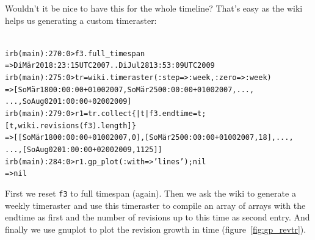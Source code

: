 \documentclass[a4paper]{scrartcl}
\newcounter{tcounter}
\newcommand{\tcount}{\makebox[0pt][r]{\tiny\thetcounter~}}
\newenvironment{typed}{\refstepcounter{tcounter}\bgroup\setlength{\topsep}{0pt}\renewcommand{\FrameCommand}[1]{\fcolorbox{black!30}{bgcolor}{##1}\tcount}\MakeFramed{\FrameRestore}\begin{alltt}\small}{\end{alltt}\endMakeFramed\egroup\par\aftergroup\noindent\aftergroup\ignorespaces}
\newcommand{\cmd}[1]{\texttt{\color{cmd}#1}}
\newcommand{\p}{\textcolor{prompt}}
\renewcommand{\c}{\textcolor{cmd}}
\begin{document}
Wouldn't it be nice to have this for the whole timeline? That's easy
as the wiki helps us generating a custom timeraster:
\begin{typed}\label{typed:revtr}
\p{irb(main):270:0>} \c{f3.full_timespan}
=> Di Mär 20 18:23:15 UTC 2007..Di Jul 28 13:53:09 UTC 2009
\p{irb(main):275:0>} \c{tr = wiki.timeraster(:step => :week, :zero => :week)}
=> [So Mär 18 00:00:00 +0100 2007, So Mär 25 00:00:00 +0100 2007, ...,
                                     ..., So Aug 02 01:00:00 +0200 2009]
\p{irb(main):279:0>} \c{ r1 = tr.collect \{ |t| f3.endtime = t; 
                                        [t, wiki.revisions(f3).length] \}}
=> [[So Mär 18 00:00:00 +0100 2007, 0], [So Mär 25 00:00:00 +0100 2007, 18], ...,
                                     ..., [So Aug 02 01:00:00 +0200 2009, 1125]]
\p{irb(main):284:0>} \c{r1.gp_plot(:with => 'lines'); nil}
=> nil
\end{typed}
First we reset \cmd{f3} to full timespan (again). Then we ask the wiki
to generate a weekly timeraster and use this timeraster to compile an
array of arrays with the endtime as first and the number of revisions
up to this time as second entry. And finally we use gnuplot to plot
the revision growth in time (figure~\ref{fig:gp_revtr}).
\end{document}
